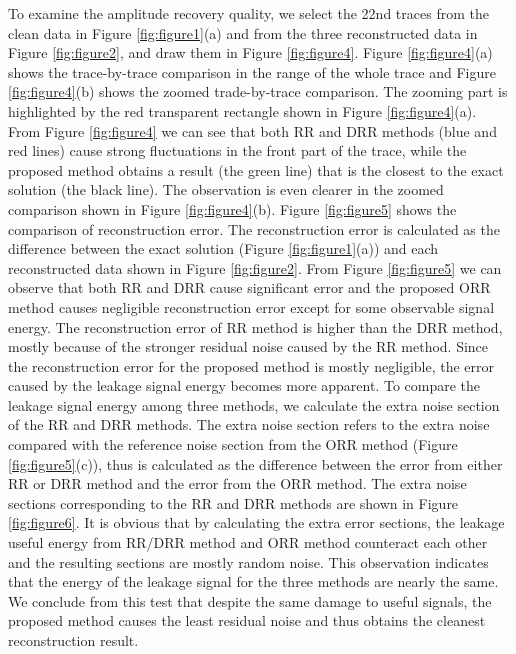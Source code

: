 To examine the amplitude recovery quality, we select the 22nd traces from the clean data in Figure \ref{fig:figure1}(a) and from the three reconstructed data in Figure \ref{fig:figure2}, and draw them in Figure \ref{fig:figure4}. Figure \ref{fig:figure4}(a) shows the trace-by-trace comparison in the range of the whole trace and Figure \ref{fig:figure4}(b) shows the zoomed trade-by-trace comparison. The zooming part is highlighted by the red transparent rectangle shown in Figure \ref{fig:figure4}(a). From Figure \ref{fig:figure4} we can see that both RR and DRR methods (blue and red lines) cause strong fluctuations in the front part of the trace, while the proposed method obtains a result (the green line) that is the closest to the exact solution (the black line). The observation is even clearer in the zoomed comparison shown in Figure \ref{fig:figure4}(b). Figure \ref{fig:figure5} shows the comparison of reconstruction error. The reconstruction error is calculated as the difference between the exact solution (Figure \ref{fig:figure1}(a)) and each reconstructed data shown in Figure \ref{fig:figure2}. From Figure \ref{fig:figure5} we can observe that both RR and DRR cause significant error and the proposed ORR method causes negligible reconstruction error except for some observable signal energy. The reconstruction error of RR method is higher than the DRR method, mostly because of the stronger residual noise caused by the RR method. Since the reconstruction error for the proposed method is mostly negligible, the error caused by the leakage signal energy becomes more apparent. To compare the leakage signal energy among three methods, we calculate the extra noise section of the RR and DRR methods. The extra noise section refers to the extra noise compared with the reference noise section from the ORR method (Figure \ref{fig:figure5}(c)), thus is calculated as the difference between the error from either RR or DRR method and the error from the ORR method. The extra noise sections corresponding to the RR and DRR methods are shown in Figure \ref{fig:figure6}. It is obvious that by calculating the extra error sections, the leakage useful energy from RR/DRR method and ORR method counteract each other and the resulting sections are mostly random noise. This observation indicates that the energy of the leakage signal for the three methods are nearly the same. We conclude from this test that despite the same damage to useful signals, the proposed method causes the least residual noise and thus obtains the cleanest reconstruction result.

